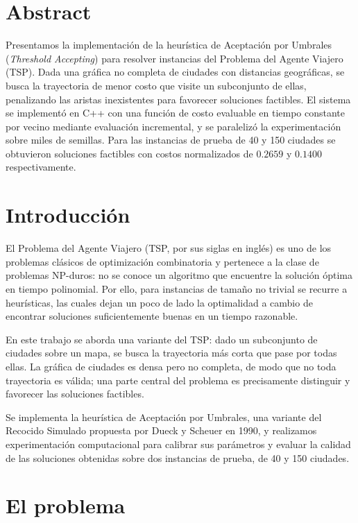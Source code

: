 \documentclass[letterpaper,12pt]{article} %
\begin{document}
    
    \newpage


\section{Abstract}

Presentamos la implementación de la heurística de Aceptación por Umbrales
(\textit{Threshold Accepting}) para resolver instancias del Problema del Agente
Viajero (TSP). Dada una gráfica no completa de ciudades con distancias
geográficas, se busca la trayectoria de menor costo que visite un subconjunto
de ellas, penalizando las aristas inexistentes para favorecer soluciones
factibles. El sistema se implementó en C++ con una función de costo evaluable
en tiempo constante por vecino mediante evaluación incremental, y se
paralelizó la experimentación sobre miles de semillas. Para las instancias de
prueba de 40 y 150 ciudades se obtuvieron soluciones factibles con costos
normalizados de $0.2659$ y $0.1400$ respectivamente.

\section{Introducción}

El Problema del Agente Viajero (TSP, por sus siglas en inglés) es uno de los
problemas clásicos de optimización combinatoria y pertenece a la clase de
problemas NP-duros: no se conoce un algoritmo que encuentre la solución óptima
en tiempo polinomial. Por ello, para instancias de tamaño no trivial se recurre
a heurísticas, las cuales dejan un poco de lado la optimalidad a cambio de encontrar
soluciones suficientemente buenas en un tiempo razonable.

En este trabajo se aborda una variante del TSP: dado un subconjunto de ciudades
sobre un mapa, se busca la trayectoria más corta que pase por todas ellas. La
gráfica de ciudades es densa pero no completa, de modo que no toda trayectoria
es válida; una parte central del problema es precisamente distinguir y favorecer
las soluciones factibles.

Se implementa la heurística de Aceptación por Umbrales, una variante del
Recocido Simulado propuesta por Dueck y Scheuer en 1990, y realizamos
experimentación computacional para calibrar sus parámetros y evaluar la calidad
de las soluciones obtenidas sobre dos instancias de prueba, de 40 y 150
ciudades.

\section{El problema}
\end{document}
